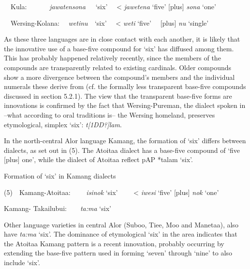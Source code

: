 \ \ Kula: \ \ \ \ \ \ \textit{jawatensona}\textbf{ \ \ }{\textquoteleft}six{\textquoteright} \ \ {\textless} \textit{jawetena} {\textquoteleft}five{\textquoteright} [plus] \textit{sona} {\textquoteleft}one{\textquoteright}

\ \ Wersing-Kolana: \ \ \textit{weti}\textit{{\ng}}\textit{nu}\textit{{\ng}\ \ }{\textquoteleft}six{\textquoteright} \ \ {\textless} \textit{weti}\textit{{\ng}} {\textquoteleft}five{\textquoteright} \ \ [plus] \textit{nu}\textit{{\ng}}\textit{ }{\textquoteleft}single{\textquoteright}

As these three languages are in close contact with each another, it is likely that the innovative use of a base-five compound for {\textquoteleft}six{\textquoteright} has diffused among them. This has probably happened relatively recently, since the members of the compounds are transparently related to existing cardinals. Older compounds show a more divergence between the compound{\textquoteright}s members and the individual numerals these derive from (cf. the formally less transparent base-five compounds discussed in section 5.2.1). The view that the transparent base-five forms are innovations is confirmed by the fact that Wersing-Pureman, the dialect spoken in --what according to oral traditions is-- the Wersing homeland, preserves etymological, simplex {\textquoteleft}six{\textquoteright}: \textit{t}\textit{[1DD?]}\textit{lam}.

In the north-central Alor language Kamang, the formation of {\textquoteleft}six{\textquoteright} differs between dialects, as set out in (5). The Atoitaa dialect has a base-five compound of {\textquoteleft}five [plus] one{\textquoteright}, while the dialect of Atoitaa reflect p\textsc{AP} *talam {\textquoteleft}six{\textquoteright}. 

Formation of {\textquoteleft}six{\textquoteright} in Kamang dialects

(5)\ \ Kamang{}-Atoitaa: \ \ \ \ \textit{isi}\textit{{\ng}}\textit{nok}\textbf{ }{\textquoteleft}six{\textquoteright} \ \ \ \ {\textless} \textit{iwesi}\textit{{\ng}}\textit{ }{\textquoteleft}five{\textquoteright} [plus] \textit{nok }{\textquoteleft}one{\textquoteright}

Kamang{}- Takailubui:\ \ \ \ \textit{ta:ma }{\textquoteleft}six{\textquoteright} \ \ 

Other language varieties in central Alor (Suboo, Tiee, Moo and Manetaa), also have \textit{ta:ma} {\textquoteleft}six{\textquoteright}. The dominance of etymological {\textquoteleft}six{\textquoteright} in the area indicates that the Atoitaa Kamang pattern is a recent innovation, probably occurring by extending the base-five pattern used in forming {\textquoteleft}seven{\textquoteright} through {\textquoteleft}nine{\textquoteright} to also include {\textquoteleft}six{\textquoteright}. 

